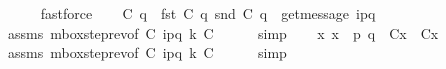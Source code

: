\begin{isabellebody}
\ \ \ \ \isamarkupfalse%
\ fastforce\isanewline
\ \ \isamarkupfalse%
\ {\isachardoublequoteopen}C{}\ q\ {\isacharequal}{\kern0pt}\ {\isacharparenleft}{\kern0pt}fst\ {\isacharparenleft}{\kern0pt}C{}\ q{\isacharparenright}{\kern0pt}{\isacharcomma}{\kern0pt}\ {\isacharparenleft}{\kern0pt}snd\ {\isacharparenleft}{\kern0pt}C{}\ q{\isacharparenright}{\kern0pt}{\isacharparenright}{\kern0pt}\ {\isasymcdot}\ {\isacharbrackleft}{\kern0pt}get{\isacharunderscore}{\kern0pt}message\ {\isacharparenleft}{\kern0pt}{\isacharbang}{\kern0pt}{\isasymlangle}{\isacharparenleft}{\kern0pt}i\isactrlbsup p{\isasymrightarrow}q\isactrlesup {\isacharparenright}{\kern0pt}{\isasymrangle}{\isacharparenright}{\kern0pt}{\isacharbrackright}{\kern0pt}{\isacharparenright}{\kern0pt}{\isachardoublequoteclose}\isanewline
\ \ \ \ \isamarkupfalse%
\ assms\ mbox{\isacharunderscore}{\kern0pt}step{\isacharunderscore}{\kern0pt}rev{\isacharparenleft}{\kern0pt}{}{\isacharparenright}{\kern0pt}{\isacharbrackleft}{\kern0pt}of\ C{}\ {\isachardoublequoteopen}{\isacharbang}{\kern0pt}{\isasymlangle}{\isacharparenleft}{\kern0pt}i\isactrlbsup p{\isasymrightarrow}q\isactrlesup {\isacharparenright}{\kern0pt}{\isasymrangle}{\isachardoublequoteclose}\ k\ C{}{\isacharbrackright}{\kern0pt}\isanewline
\ \ \ \ \isamarkupfalse%
\ simp\isanewline
\ \ \isamarkupfalse%
\ {\isachardoublequoteopen}{\isasymforall}x{\isachardot}{\kern0pt}\ x\ {\isasymnotin}\ {\isacharbraceleft}{\kern0pt}p{\isacharcomma}{\kern0pt}\ q{\isacharbraceright}{\kern0pt}\ {\isasymlongrightarrow}\ C{}{\isacharparenleft}{\kern0pt}x{\isacharparenright}{\kern0pt}\ {\isacharequal}{\kern0pt}\ C{}{\isacharparenleft}{\kern0pt}x{\isacharparenright}{\kern0pt}{\isachardoublequoteclose}\isanewline
\ \ \ \ \isamarkupfalse%
\ assms\ mbox{\isacharunderscore}{\kern0pt}step{\isacharunderscore}{\kern0pt}rev{\isacharparenleft}{\kern0pt}{}{}{\isacharparenright}{\kern0pt}{\isacharbrackleft}{\kern0pt}of\ C{}\ {\isachardoublequoteopen}{\isacharbang}{\kern0pt}{\isasymlangle}{\isacharparenleft}{\kern0pt}i\isactrlbsup p{\isasymrightarrow}q\isactrlesup {\isacharparenright}{\kern0pt}{\isasymrangle}{\isachardoublequoteclose}\ k\ C{}{\isacharbrackright}{\kern0pt}\isanewline
\ \ \ \ \isamarkupfalse%
\ simp\isanewline
{}\isamarkupfalse%
%
\endisatagproof
{\isafoldproof}%
%
\isadelimproof

\end{isabellebody}
